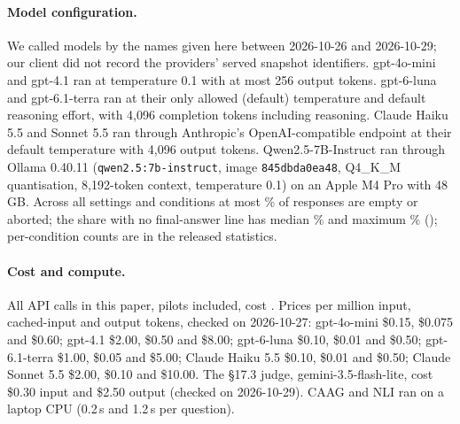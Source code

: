 \paragraph{Model configuration.} We called models by the names given here between 2026-10-26 and 2026-10-29;
our client did not record the providers' served snapshot identifiers. gpt-4o-mini and gpt-4.1 ran at temperature 0.1
with at most 256 output tokens. gpt-6-luna and gpt-6.1-terra ran at their only allowed (default) temperature and default
reasoning effort, with 4,096 completion tokens including reasoning. Claude Haiku 5.5 and Sonnet 5.5 ran through
Anthropic's OpenAI-compatible endpoint at their default temperature with 4,096 output tokens. Qwen2.5-7B-Instruct ran
through Ollama 0.40.11 (\texttt{qwen2.5:7b-instruct}, image \texttt{845dbda0ea48}, Q4\_K\_M quantisation, 8,192-token
context, temperature 0.1) on an Apple M4 Pro with 48\,GB. Across all settings and conditions at most \truncMaxEmpty\% of
responses are empty or aborted; the share with no final-answer line has median \truncMedNoFinal\% and maximum
\truncMaxNoFinal\% (\truncMaxAt); per-condition counts are in the released statistics.

\paragraph{Cost and compute.} All API calls in this paper, pilots included, cost \totalSpend. Prices per million input, cached-input and output tokens, checked on 2026-10-27: gpt-4o-mini \$0.15, \$0.075 and \$0.60; gpt-4.1 \$2.00, \$0.50 and \$8.00; gpt-6-luna \$0.10, \$0.01 and \$0.50; gpt-6.1-terra \$1.00, \$0.05 and \$5.00; Claude Haiku 5.5 \$0.10, \$0.01 and
\$0.50; Claude Sonnet 5.5 \$2.00, \$0.10 and \$10.00. The \S17.3 judge, gemini-3.5-flash-lite, cost \$0.30 input and \$2.50 output (checked on 2026-10-29). CAAG and NLI ran on a
laptop CPU (0.2\,s and 1.2\,s per question).

